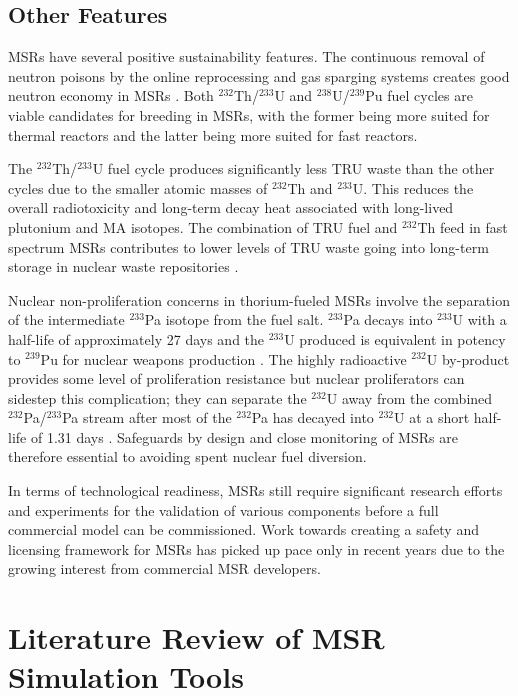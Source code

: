 \subsection{Other Features}

\glspl{MSR} have several positive sustainability features.
The continuous removal of neutron poisons by the online reprocessing and gas
sparging systems creates good neutron economy in \glspl{MSR}
\cite{kamei_recent_2012}. Both
$^{232}$Th/$^{233}$U and $^{238}$U/$^{239}$Pu fuel cycles are viable
candidates for breeding in \glspl{MSR}, with the former being more suited for
thermal reactors and the latter being more suited for fast reactors.

The $^{232}$Th/$^{233}$U fuel cycle produces significantly less \gls{TRU}
waste than the other cycles due to the smaller atomic masses of $^{232}$Th and
$^{233}$U. This reduces the overall radiotoxicity and long-term decay heat
associated with long-lived plutonium and \gls{MA} isotopes. The combination
of \gls{TRU} fuel and $^{232}$Th feed in fast spectrum \glspl{MSR} contributes
to lower levels of \gls{TRU} waste going into long-term storage in
nuclear waste repositories \cite{merle-lucotte_launching_2011}.

Nuclear non-proliferation concerns in thorium-fueled \glspl{MSR} involve the
separation of the intermediate $^{233}$Pa
isotope from the fuel salt. $^{233}$Pa decays into $^{233}$U with a half-life
of approximately 27 days and the $^{233}$U produced is equivalent in potency
to $^{239}$Pu for nuclear weapons production \cite{grape_10_2017}. The highly
radioactive $^{232}$U
by-product provides some level of proliferation resistance but nuclear
proliferators can sidestep this complication; they can
separate the $^{232}$U away from the combined $^{232}$Pa/$^{233}$Pa stream
after most of the $^{232}$Pa has decayed into $^{232}$U at a short half-life
of 1.31 days \cite{grape_10_2017}. Safeguards by design and close monitoring
of \glspl{MSR} are therefore essential to avoiding spent nuclear fuel
diversion.

In terms of technological readiness, \glspl{MSR} still require significant
research efforts and experiments for the validation of
various components before a full commercial model can be commissioned. Work
towards creating a safety and licensing framework for \glspl{MSR} has picked
up pace only in recent years due to the growing interest from commercial
\gls{MSR} developers.

\section{Literature Review of MSR Simulation Tools} \label{sec:litrev}

